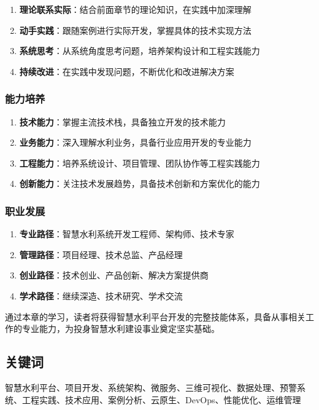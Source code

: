 \begin{enumerate}
\def\labelenumi{\arabic{enumi}.}
\tightlist
\item
  \textbf{理论联系实际}：结合前面章节的理论知识，在实践中加深理解
\item
  \textbf{动手实践}：跟随案例进行实际开发，掌握具体的技术实现方法
\item
  \textbf{系统思考}：从系统角度思考问题，培养架构设计和工程实践能力
\item
  \textbf{持续改进}：在实践中发现问题，不断优化和改进解决方案
\end{enumerate}

\subsubsection{能力培养}\label{ux80fdux529bux57f9ux517b}

\begin{enumerate}
\def\labelenumi{\arabic{enumi}.}
\tightlist
\item
  \textbf{技术能力}：掌握主流技术栈，具备独立开发的技术能力
\item
  \textbf{业务能力}：深入理解水利业务，具备行业应用开发的专业能力
\item
  \textbf{工程能力}：培养系统设计、项目管理、团队协作等工程实践能力
\item
  \textbf{创新能力}：关注技术发展趋势，具备技术创新和方案优化的能力
\end{enumerate}

\subsubsection{职业发展}\label{ux804cux4e1aux53d1ux5c55}

\begin{enumerate}
\def\labelenumi{\arabic{enumi}.}
\tightlist
\item
  \textbf{专业路径}：智慧水利系统开发工程师、架构师、技术专家
\item
  \textbf{管理路径}：项目经理、技术总监、产品经理
\item
  \textbf{创业路径}：技术创业、产品创新、解决方案提供商
\item
  \textbf{学术路径}：继续深造、技术研究、学术交流
\end{enumerate}

通过本章的学习，读者将获得智慧水利平台开发的完整技能体系，具备从事相关工作的专业能力，为投身智慧水利建设事业奠定坚实基础。

\subsection{关键词}\label{ux5173ux952eux8bcd}

智慧水利平台、项目开发、系统架构、微服务、三维可视化、数据处理、预警系统、工程实践、技术应用、案例分析、云原生、DevOps、性能优化、运维管理
